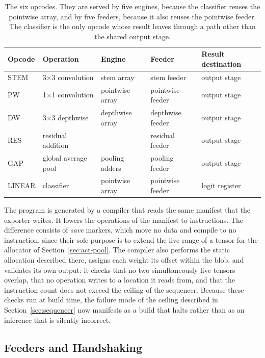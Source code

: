 \begin{table}[t]
  \centering
  \caption{The six opcodes. They are served by five engines, because the
           classifier reuses the pointwise array, and by five feeders, because
           it also reuses the pointwise feeder. The classifier is the only
           opcode whose result leaves through a path other than the shared
           output stage.}
  \label{tab:opcodes}
  \small
  \begin{tabular}{lllll}
    \toprule
    Opcode & Operation & Engine & Feeder & Result destination \\
    \midrule
    STEM   & 3$\times$3 convolution   & stem array      & stem feeder      & output stage \\
    PW     & 1$\times$1 convolution   & pointwise array & pointwise feeder & output stage \\
    DW     & 3$\times$3 depthwise     & depthwise array & depthwise feeder & output stage \\
    RES    & residual addition        & ---             & residual feeder  & output stage \\
    GAP    & global average pool      & pooling adders  & pooling feeder   & output stage \\
    LINEAR & classifier               & pointwise array & pointwise feeder & logit register \\
    \bottomrule
  \end{tabular}
\end{table}

The program is generated by a compiler that reads the same manifest that the
exporter writes. It lowers the \thManifestOps{} operations of the manifest to
\thInstructions{} instructions. The difference consists of \thSaveOps{}
\emph{save} markers, which move no data and compile to no instruction, since
their sole purpose is to extend the live range of a tensor for the allocator of
Section~\ref{sec:act-pool}. The compiler also performs the static allocation
described there, assigns each weight its offset within the blob, and validates
its own output: it checks that no two simultaneously live tensors overlap, that
no operation writes to a location it reads from, and that the instruction count
does not exceed the ceiling of the sequencer. Because these checks run at build
time, the failure mode of the ceiling described in Section~\ref{sec:sequencer}
now manifests as a build that halts rather than as an inference that is
silently incorrect.

\subsection{Feeders and Handshaking}
\label{sec:feeders}


